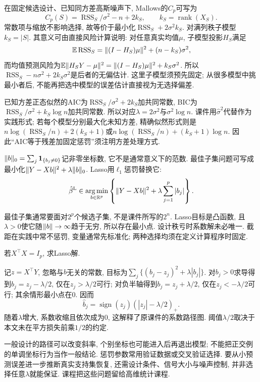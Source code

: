 在固定候选设计、已知同方差高斯噪声下, Mallows的$C_p$可写为
\[
 C_p(S)=\operatorname{RSS}_S/\sigma^2-n+2k_S,
 \qquad k_S=\operatorname{rank}(X_S).
\]
常数项与缩放不影响选择, 故等价于最小化$\operatorname{RSS}_S+2\sigma^2k_S$. 对满列秩子模型$k_S=|S|$. 其意义可由直接风险计算说明: 对任意真实均值$\mu$, 子模型投影$H_S$满足
\[
 \mathbb E\operatorname{RSS}_S=\lVert (I-H_S)\mu\rVert^2+(n-k_S)\sigma^2,
\]
而均值预测风险为$\mathbb E\lVert H_SY-\mu\rVert^2=\lVert (I-H_S)\mu\rVert^2+k_S\sigma^2$. 所以$\operatorname{RSS}_S-n\sigma^2+2k_S\sigma^2$是后者的无偏估计. 这里子模型须预先固定; 从很多模型中挑最小者后, 不能再把选中模型的误差估计直接视为无选择偏差.

已知方差正态似然的AIC为$\operatorname{RSS}_S/\sigma^2+2k_S$加共同常数, BIC为$\operatorname{RSS}_S/\sigma^2+k_S\log n$加共同常数. 所以对应$\lambda=2\sigma^2$与$\sigma^2\log n$. 课件用$\hat\sigma^2$代替作为实践形式; 若每个模型分别最大化未知方差, 精确似然形式则是$n\log(\operatorname{RSS}_S/n)+2(k_S+1)$或$n\log(\operatorname{RSS}_S/n)+(k_S+1)\log n$. 因此``AIC等于残差加固定惩罚''须注明方差处理方式.

\begin{definition}
$\lVert b\rVert_0=\sum_j\mathbf 1_{\{b_j\ne0\}}$记非零坐标数, 它不是通常意义下的范数. 最佳子集问题可写成最小化$\lVert Y-Xb\rVert^2+\lambda\lVert b\rVert_0$. Lasso用$\ell_1$惩罚替换它:
\[
 \hat\beta^{\rm L}\in\operatorname*{arg\,min}_{b\in\mathbb R^p}
 \left\{\lVert Y-Xb\rVert^2+\lambda\sum_{j=1}^p|b_j|\right\}.
\]
\end{definition}
最佳子集通常要面对$2^p$个候选子集, 不是课件所写的$2^n$. Lasso目标是凸函数, 且$\lambda>0$使它随$\lVert b\rVert\to\infty$趋于无穷, 所以存在最小点. 设计秩亏时系数解未必唯一. 截距在实践中常不惩罚, 变量通常先标准化; 两种选择均须在定义计算程序时固定.

\begin{example}
若$X^\top X=I_p$, 求Lasso解.
\end{example}
\begin{solution}
记$z=X^\top Y$, 忽略与$b$无关的常数, 目标为$\sum_j\{(b_j-z_j)^2+\lambda|b_j|\}$. 对$b_j>0$求导得到$b_j=z_j-\lambda/2$, 仅在$z_j>\lambda/2$可行; 对负半轴得到$b_j=z_j+\lambda/2$, 仅在$z_j<-\lambda/2$可行; 其余情形最小点在0. 因而
\[
 \hat b_j=\operatorname{sign}(z_j)(|z_j|-\lambda/2)_+.
\]
随着$\lambda$增大, 系数收缩且依次成为0, 这解释了原课件的系数路径图. 阈值$\lambda/2$取决于本文未在平方损失前乘$1/2$的约定.
\end{solution}
一般设计的路径可以改变斜率, 个别坐标也可能进入后再退出模型; 不能把正交例的单调坐标行为当作一般结论. 惩罚参数常用验证数据或交叉验证选择. 要从小预测误差进一步推断真实支持集恢复, 还需设计条件、信号大小与噪声控制, 并非选择任意$\lambda$就能保证. 课程把这些问题留给高维统计课程.

